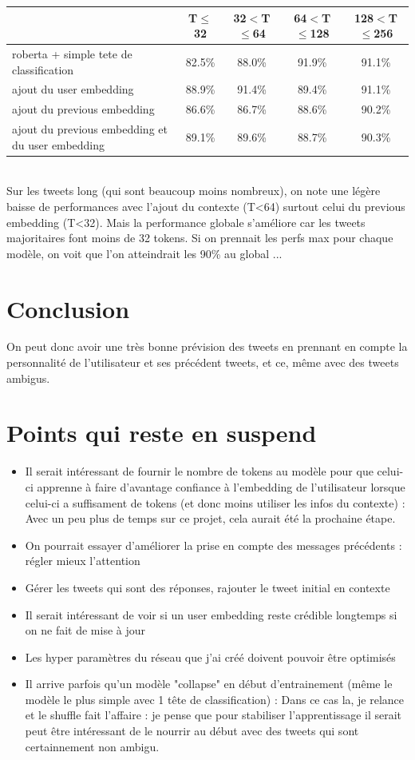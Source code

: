 \documentclass[12pt]{article}
\begin{document}
\begin{center}
\begin{tabular}{lcccc}
\toprule
 & T$\le$32 & 32$<$T$\le$64 & 64$<$T$\le$128 & 128$<$T$\le$256 \\
\midrule
roberta + simple tete de classification & 82.5\% & 88.0\% & 91.9\% & 91.1\% \\
ajout du user embedding & 88.9\% & 91.4\% & 89.4\% & 91.1\% \\
ajout du previous embedding & 86.6\% & 86.7\% & 88.6\% & 90.2\% \\
ajout du previous embedding et du user embedding & 89.1\% & 89.6\% & 88.7\% & 90.3\% \\
\bottomrule
\end{tabular}
\end{center}
\\
Sur les tweets long (qui sont beaucoup moins nombreux), on note une légère baisse de performances avec l'ajout du contexte (T<64) surtout celui du previous embedding (T<32). Mais la performance globale s'améliore car les tweets majoritaires font moins de 32 tokens. Si on prennait les perfs max pour chaque modèle,
on voit que l'on atteindrait les 90\% au global ...

\section{Conclusion}
On peut donc avoir une très bonne prévision des tweets en prennant en compte la personnalité de l'utilisateur et ses précédent tweets, et ce, même avec des tweets ambigus. 

\section{Points qui reste en suspend}

\begin{itemize}
\item  Il serait intéressant de fournir le nombre de tokens au modèle pour que celui-ci apprenne à faire d'avantage confiance à l'embedding de l'utilisateur
lorsque celui-ci a suffisament de tokens (et donc moins utiliser les infos du contexte) : Avec un peu plus de temps sur ce projet, cela aurait été la 
prochaine étape.
\item  On pourrait essayer d'améliorer la prise en compte des messages précédents : régler mieux l'attention
\item  Gérer les tweets qui sont des réponses, rajouter le tweet initial en contexte
\item  Il serait intéressant de voir si un user embedding reste crédible longtemps si on ne fait de mise à jour 
\item  Les hyper paramètres du réseau que j'ai créé doivent pouvoir être optimisés 
\item  Il arrive parfois qu'un modèle "collapse" en début d'entrainement (même le modèle le plus simple avec 1 tête de classification) :
Dans ce cas la, je relance et le shuffle fait l'affaire : je pense que pour stabiliser l'apprentissage il serait peut être intéressant de le
nourrir au début avec des tweets qui sont certainnement non ambigu.
\end{itemize}
\end{document}

